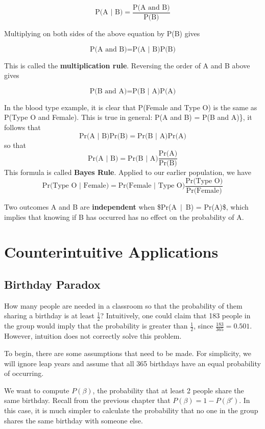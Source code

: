 \documentclass[
]{book}
\begin{document}
\[
\mbox{P(A | B)} = \frac{\mbox{P(A and B)}}{\mbox{P(B)}}
\]

Multiplying on both sides of the above equation by P(B) gives

\[
\mbox{P(A and B)} = \mbox{P(A | B)}\mbox{P(B)}  
\]

This is called the \textbf{multiplication rule}. Reversing the order of A and B above gives

\[
\mbox{P(B and A)} = \mbox{P(B | A)}\mbox{P(A)}  
\]

In the blood type example, it is clear that P(Female and Type O) is the same as P(Type O and Female).
This is true in general: P(A and B) = P(B and A)\}, it follows that
\[
\mbox{Pr(A $|$ B)}\mbox{Pr(B)}  = \mbox{Pr(B $|$ A)}\mbox{Pr(A)} 
\]
so that
\[
\mbox{Pr(A $|$ B)}  = \mbox{Pr(B $|$ A)}\frac{\mbox{Pr(A)}}{\mbox{Pr(B)}}
\]
This formula is called \textbf{Bayes Rule}. Applied to our earlier population, we have
\[
\mbox{Pr(Type O $|$ Female)} = \mbox{Pr(Female $|$ Type O)}\frac{\mbox{Pr(Type O)}}{\mbox{Pr(Female)}}
\]

Two outcomes A and B are \textbf{independent} when \$\mbox{Pr(A $|$ B)} = \mbox{Pr(A)}\$,
which implies that knowing if B has occurred has no effect on the probability of A.

\hypertarget{counterintuitive-applications}{%
\chapter{Counterintuitive Applications}\label{counterintuitive-applications}}

\hypertarget{birthday-paradox}{%
\section{Birthday Paradox}\label{birthday-paradox}}

How many people are needed in a classroom so that the probability of them sharing a birthday is at least \(\frac{1}{2}\)?
Intuitively, one could claim that 183 people in the group would imply that the probability is greater than \(\frac{1}{2}\),
since \(\frac{183}{365} = 0.501\). However, intuition does not correctly solve this problem.

To begin, there are some assumptions that need to be made.
For simplicity, we will ignore leap years and assume that all 365 birthdays have an equal probability of occurring.

We want to compute \(P(\beta)\), the probability that at least 2 people share the same birthday.
Recall from the previous chapter that \(P(\beta) = 1 - P(\beta')\).
In this case, it is much simpler to calculate the probability that no one in the group shares the same birthday with someone else.
\end{document}
